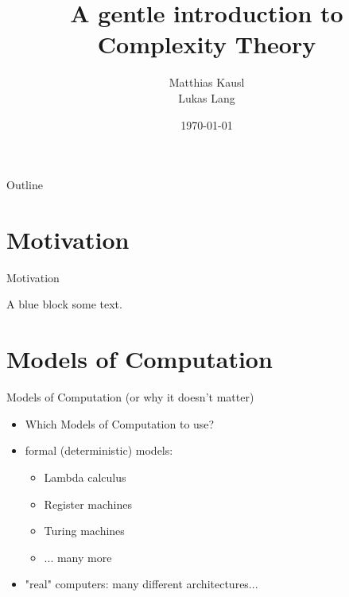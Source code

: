 \documentclass[c]{beamer}
\title{A gentle introduction to Complexity Theory}
\author{Matthias Kausl \\ Lukas Lang}
\institute{Vienna University of Technology}
\date{\today}
\begin{document}
\begin{frame}
\titlepage
\end{frame}

\begin{frame}{Outline}
	\tableofcontents
\end{frame}

\section{Motivation}

\begin{frame}{Motivation}
          
	\begin{block}{A blue block}
		some text.
          \end{block}
\end{frame}

\section{Models of Computation}
\begin{frame}{Models of Computation (or why it doesn't matter)}
          \begin{itemize}
			\item Which Models of Computation to use?
			\item formal (deterministic) models:
			\begin{itemize}
				\item Lambda calculus
				\item Register machines
				\item Turing machines
				\item ... many more
			\end{itemize}
			\item "real" computers: many different architectures...
		  \end{itemize}
\end{frame}		
\end{document}
